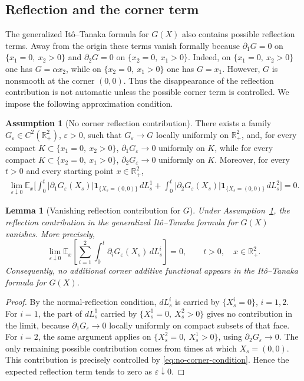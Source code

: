 \documentclass[pdflatex,sn-mathphys-num]{sn-jnl}
\theoremstyle{plain}
\newtheorem{lemma}[theorem]{Lemma}
\theoremstyle{definition}
\newtheorem{assumption}[theorem]{Assumption}
\newcommand{\R}{\mathbb{R}}
\begin{document}
\subsection{Reflection and the corner term}
\label{sec:reflection-corner}
The generalized It\^o--Tanaka formula for $G(X)$ also contains possible
reflection terms. Away from the origin these terms vanish formally because
$\partial_1G=0$ on $\{x_1=0,\ x_2>0\}$ and $\partial_2G=0$ on
$\{x_2=0,\ x_1>0\}$. Indeed, on $\{x_1=0,\ x_2>0\}$ one has $G=\alpha x_2$,
while on $\{x_2=0,\ x_1>0\}$ one has $G=x_1$. However, $G$ is nonsmooth at the
corner $(0,0)$. Thus the disappearance of the reflection contribution is not
automatic unless the possible corner term is controlled. We impose the
following approximation condition.

\begin{assumption}[No corner reflection contribution]
\label{ass:no-corner-reflection}
There exists a family $G_\varepsilon\in C^2(\R^2_+)$, $\varepsilon>0$, such
that $G_\varepsilon\to G$ locally uniformly on $\R^2_+$, and, for every
compact $K\subset\{x_1=0,\ x_2>0\}$, $\partial_1G_\varepsilon\to0$ uniformly on
$K$, while for every compact $K\subset\{x_2=0,\ x_1>0\}$,
$\partial_2G_\varepsilon\to0$ uniformly on $K$. Moreover, for every $t>0$ and
every starting point $x\in\R^2_+$,
\begin{align}
\label{eq:no-corner-condition}
   \lim_{\varepsilon\downarrow0}
   \mathbb E_x\Bigg[
      \int_0^t
      |\partial_1G_\varepsilon(X_s)|
      \mathbf 1_{\{X_s=(0,0)\}}\,dL_s^1+
      \int_0^t
      |\partial_2G_\varepsilon(X_s)|
      \mathbf 1_{\{X_s=(0,0)\}}\,dL_s^2
   \Bigg]
   =0.
\end{align}
\end{assumption}

\begin{lemma}[Vanishing reflection contribution for $G$]
\label{lem:vanishing-reflection-G}
Under Assumption~\ref{ass:no-corner-reflection}, the reflection contribution in
the generalized It\^o--Tanaka formula for $G(X)$ vanishes. More precisely,
\[
   \lim_{\varepsilon\downarrow0}
   \mathbb E_x\left[
      \sum_{i=1}^2
      \int_0^t \partial_iG_\varepsilon(X_s)\,dL_s^i
   \right]
   =0,
   \qquad t>0,\quad x\in\R^2_+.
\]
Consequently, no additional corner additive functional appears in the
It\^o--Tanaka formula for $G(X)$.
\end{lemma}
\begin{proof}
By the normal-reflection condition, $dL_s^i$ is carried by $\{X_s^i=0\}$,
$i=1,2$. For $i=1$, the part of $dL_s^1$ carried by $\{X_s^1=0,\ X_s^2>0\}$
gives no contribution in the limit, because $\partial_1G_\varepsilon\to0$
locally uniformly on compact subsets of that face. For $i=2$, the same
argument applies on $\{X_s^2=0,\ X_s^1>0\}$, using
$\partial_2G_\varepsilon\to0$. The only remaining possible contribution comes
from times at which $X_s=(0,0)$. This contribution is precisely controlled by
\eqref{eq:no-corner-condition}. Hence the expected reflection term tends to
zero as $\varepsilon\downarrow0$.
\end{proof}
\end{document}
